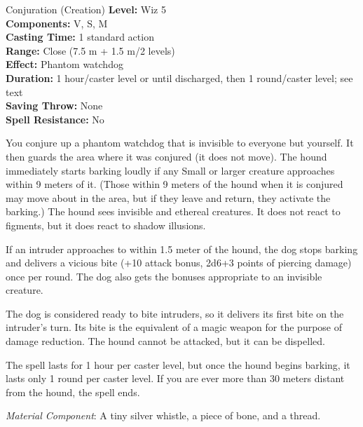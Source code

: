 {Conjuration (Creation)}
{
	\textbf{Level:}
	Wiz 5\\
	\textbf{Components:}
	V, S, M\\
	\textbf{Casting Time:}
	1 standard action\\
	\textbf{Range:}
	Close (7.5 m + 1.5 m/2 levels)\\
	\textbf{Effect:}
	Phantom watchdog\\
	\textbf{Duration:}
	1 hour/caster level or until discharged, then 1 round/caster level; see text\\
	\textbf{Saving Throw:}
	None\\
	\textbf{Spell Resistance:}
	No\\
}
{
	You conjure up a phantom watchdog that is invisible to everyone but yourself. It then guards the area where it was conjured (it does not move). The hound immediately starts barking loudly if any Small or larger creature approaches within 9 meters of it. (Those within 9 meters of the hound when it is conjured may move about in the area, but if they leave and return, they activate the barking.) The hound sees invisible and ethereal creatures. It does not react to figments, but it does react to shadow illusions.

	If an intruder approaches to within 1.5 meter of the hound, the dog stops barking and delivers a vicious bite (+10 attack bonus, 2d6+3 points of piercing damage) once per round. The dog also gets the bonuses appropriate to an invisible creature.

	The dog is considered ready to bite intruders, so it delivers its first bite on the intruder's turn. Its bite is the equivalent of a magic weapon for the purpose of damage reduction. The hound cannot be attacked, but it can be dispelled.

	The spell lasts for 1 hour per caster level, but once the hound begins barking, it lasts only 1 round per caster level. If you are ever more than 30 meters distant from the hound, the spell ends.

	\textit{Material Component}:
	A tiny silver whistle, a piece of bone, and a thread.

}
